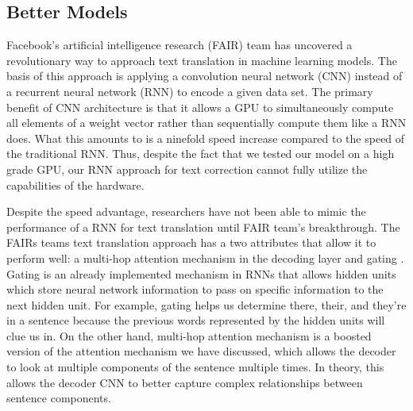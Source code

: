 \documentclass[11pt,a4paper]{scrartcl}
\theoremstyle{definition}
\begin{document}
\subsection{Better Models}
Facebook’s artificial intelligence research (FAIR) team has uncovered a revolutionary way to approach text translation in machine learning models. The basis of this approach is applying a convolution neural network (CNN) instead of a recurrent neural network (RNN) to encode a given data set. The primary benefit of CNN architecture is that it allows a GPU to simultaneously compute all elements of a weight vector rather than sequentially compute them like a RNN does. What this amounts to is a ninefold speed increase compared to the speed of the traditional RNN. Thus, despite the fact that we tested our model on a high grade GPU, our RNN approach for text correction cannot fully utilize the capabilities of the hardware. \newline

Despite the speed advantage, researchers have not been able to mimic the performance of a RNN for text translation until FAIR team’s breakthrough. The FAIRs teams text translation approach has a two attributes that allow it to perform well: a multi-hop attention mechanism in the decoding layer and gating \cite{Gehring}. Gating is an already implemented mechanism in RNNs that allows hidden units which store neural network information to pass on specific information to the next hidden unit. For example, gating helps us determine there, their, and they’re in a sentence because the previous words represented by the hidden units will clue us in. On the other hand, multi-hop attention mechanism is a boosted version of the attention mechanism we have discussed, which allows the decoder to look at multiple components of the sentence multiple times. In theory, this allows the decoder CNN to better capture complex relationships between sentence components.

\vspace{1em}
\end{document}
